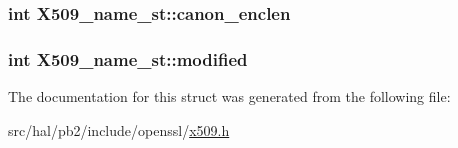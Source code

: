 \subsubsection[{\texorpdfstring{canon\+\_\+enclen}{canon_enclen}}]{\setlength{\rightskip}{0pt plus 5cm}int X509\+\_\+name\+\_\+st\+::canon\+\_\+enclen}\hypertarget{struct_x509__name__st_a264a0973bed1cf3905e3f12b5af1d269}{}\label{struct_x509__name__st_a264a0973bed1cf3905e3f12b5af1d269}
\subsubsection[{\texorpdfstring{modified}{modified}}]{\setlength{\rightskip}{0pt plus 5cm}int X509\+\_\+name\+\_\+st\+::modified}\hypertarget{struct_x509__name__st_a1bbfbc394e6971bc55d4f9ec4c22ae44}{}\label{struct_x509__name__st_a1bbfbc394e6971bc55d4f9ec4c22ae44}


The documentation for this struct was generated from the following file\+:\begin{DoxyCompactItemize}
\item 
src/hal/pb2/include/openssl/\hyperlink{x509_8h}{x509.\+h}\end{DoxyCompactItemize}
